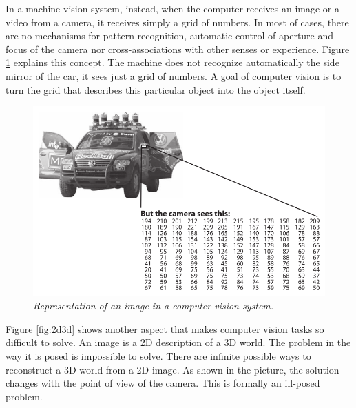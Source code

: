 	In a machine vision system, instead, when the computer receives an image or a video from a camera, it receives simply a grid of numbers. In most of cases, there are no mechanisms for pattern recognition, automatic control of aperture and focus of the camera nor cross-associations with other senses or experience.  
	Figure \ref{fig:imgMatrix} explains this concept. The machine does not recognize automatically the side mirror of the car, it sees just a grid of numbers. A goal of computer vision is to turn the grid that describes this particular object into the object itself. 
	
	
	\begin{figure}[h]
	  \begin{center} 
	    \includegraphics[scale=0.6]{images/ch_01/img_matrix.png}
	  \end{center} 
	  \caption{\textit{Representation of an image in a computer vision system.}}  
	  \label{fig:imgMatrix}
	\end{figure}

	Figure \ref{fig:2d3d} shows another aspect that makes computer vision tasks so difficult to solve. An image is a 2D description of a 3D world. The problem in the way it is posed is impossible to solve. There are infinite possible ways to reconstruct a 3D world from a 2D image. As shown in the picture, the solution changes with the point of view of the camera. This is formally an ill-posed problem.

